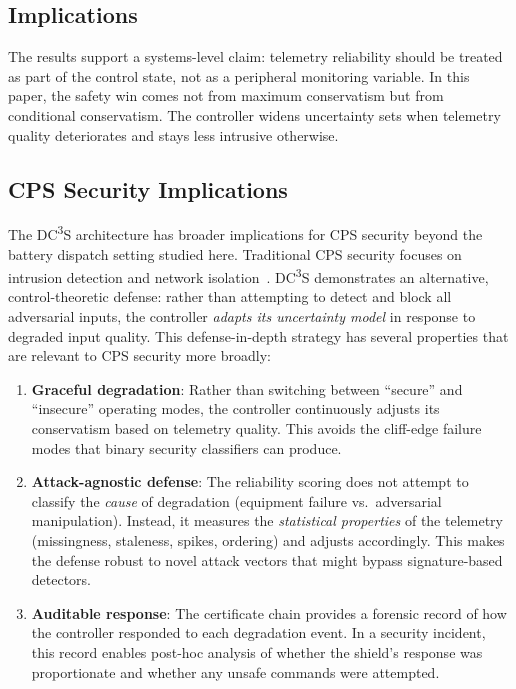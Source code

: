 \documentclass[11pt,a4paper]{article}
\begin{document}
\subsection{Implications}

The results support a systems-level claim: telemetry reliability should be treated as part of the control state, not as a peripheral monitoring variable. In this paper, the safety win comes not from maximum conservatism but from conditional conservatism. The controller widens uncertainty sets when telemetry quality deteriorates and stays less intrusive otherwise.

\subsection{CPS Security Implications}

The DC\textsuperscript{3}S architecture has broader implications for CPS security beyond the battery dispatch setting studied here. Traditional CPS security focuses on intrusion detection and network isolation~\cite{dibaji2019systems}. DC\textsuperscript{3}S demonstrates an alternative, control-theoretic defense: rather than attempting to detect and block all adversarial inputs, the controller \emph{adapts its uncertainty model} in response to degraded input quality. This defense-in-depth strategy has several properties that are relevant to CPS security more broadly:

\begin{enumerate}[leftmargin=*,topsep=2pt,itemsep=1pt]
  \item \textbf{Graceful degradation}: Rather than switching between ``secure'' and ``insecure'' operating modes, the controller continuously adjusts its conservatism based on telemetry quality. This avoids the cliff-edge failure modes that binary security classifiers can produce.
  \item \textbf{Attack-agnostic defense}: The reliability scoring does not attempt to classify the \emph{cause} of degradation (equipment failure vs.\ adversarial manipulation). Instead, it measures the \emph{statistical properties} of the telemetry (missingness, staleness, spikes, ordering) and adjusts accordingly. This makes the defense robust to novel attack vectors that might bypass signature-based detectors.
  \item \textbf{Auditable response}: The certificate chain provides a forensic record of how the controller responded to each degradation event. In a security incident, this record enables post-hoc analysis of whether the shield's response was proportionate and whether any unsafe commands were attempted.
\end{enumerate}
\end{document}
